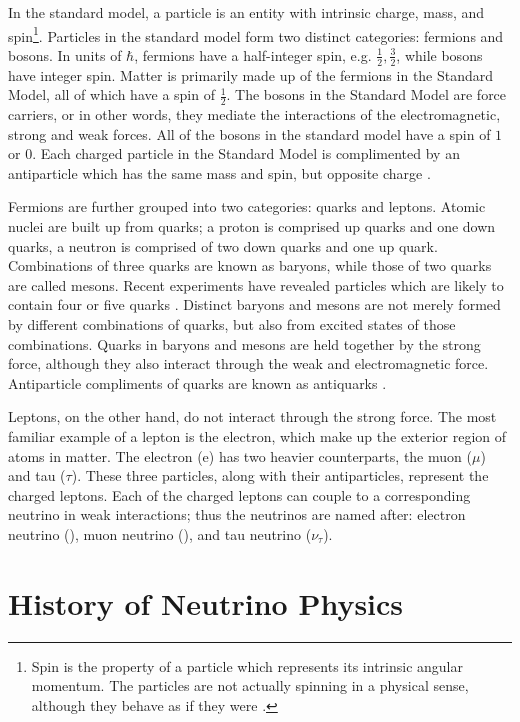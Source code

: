 In the standard model, a particle is an entity with intrinsic charge, mass, and
spin\footnote{Spin is the property of a particle which represents its intrinsic
angular momentum.  The particles are not actually spinning in a physical
sense, although they behave as if they were \cite{halzen1984quarks}.}.
Particles in the standard model form two distinct categories: fermions and
bosons.
In units of $\hbar$, fermions have a half-integer spin, e.g.
$\frac{1}{2}, \frac{3}{2}$, while bosons have integer spin.  Matter is primarily made up of the fermions in the Standard Model, all of which have a
spin of $\frac{1}{2}$.
The bosons in the Standard Model are force carriers, or in other words, they
mediate the interactions of the electromagnetic, strong and weak forces.  All
of the bosons in the standard model have a spin of $1$ or $0$.  Each
charged particle in the Standard Model is complimented by an antiparticle which
has the same mass and spin, but opposite charge \cite{halzen1984quarks}.

Fermions are further grouped into two categories: quarks and leptons.  Atomic
nuclei are built up from quarks; a proton is comprised up quarks and one down
quarks, a neutron is comprised of two down quarks and one up quark.
Combinations of three quarks are known as baryons, while those of two quarks
are called mesons.  Recent experiments have revealed particles which are likely
to contain four or five quarks \cite{dias2013z_,barth2003evidence}.  Distinct
baryons and mesons are not merely formed by different combinations of quarks,
but also from excited states of those combinations.  Quarks in baryons and
mesons are held together by the strong force, although they also interact
through the weak and electromagnetic force.  Antiparticle compliments of quarks
are known as antiquarks   \cite{halzen1984quarks}.

Leptons, on the other hand, do not interact through the strong force.  The most
familiar example of a lepton is the electron, which make up the exterior region
of atoms in matter.  The electron (e) has two heavier counterparts, the muon
($\mu$) and tau ($\tau$).  These three particles, along with their
antiparticles, represent the charged leptons.  Each of the charged leptons can
couple to a corresponding neutrino in weak interactions; thus the neutrinos are
named after: electron neutrino (\nue), muon neutrino (\numu), and tau neutrino
($\nu_\tau$).

\section{History of Neutrino Physics}

